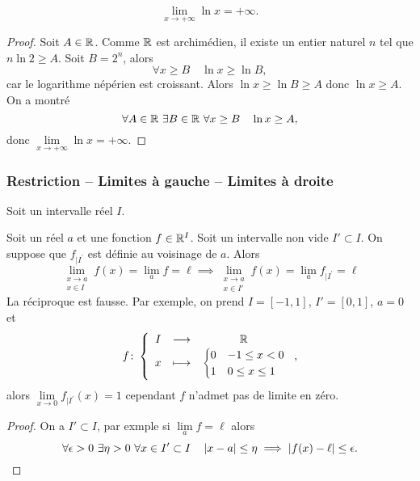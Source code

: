 \begin{theo}
  \begin{equation}
    \lim\limits_{x \to +\infty} \ln x = + \infty.
  \end{equation}
\end{theo}
\begin{proof}
  Soit $A \in \mathbb{R}$. Comme $\mathbb{R}$ est archimédien, il existe un entier naturel $n$ tel que $n \ln 2 \geq A$. Soit $B=2^n$, alors
  \begin{equation}
    \forall x \geq B \quad \ln x \geq \ln B,
  \end{equation}
  car le logarithme népérien est croissant. Alors $\ln x \geq \ln B \geq A$ donc $\ln x \geq A$. On a montré
\begin{equation}
  \forall A \in \mathbb{R} \ \exists B \in \mathbb{R} \ \forall x \geq B \quad \ln x \geq A,
\end{equation}
donc $\lim\limits_{x \to +\infty} \ln x = + \infty$.
\end{proof}

\subsubsection{Restriction -- Limites à gauche -- Limites à droite}
Soit un intervalle réel $I$.
\begin{prop}
  Soit un réel $a$ et une fonction $f \in \mathbb{R}^I$. Soit un intervalle non vide $I' \subset I$. On suppose que $f_{|I^{'}}$ est définie au voisinage de $a$. Alors
  \begin{equation}
    \lim\limits_{\begin{array}{l} x \to a \\ x \in I\end{array}}f(x)=\lim\limits_{a}f=\ell \implies \lim\limits_{\begin{array}{l} x \to a \\ x \in I'\end{array}}f(x)=\lim\limits_{a}f_{|I^{'}}=\ell
  \end{equation}
La réciproque est fausse. Par exemple, on prend $I=[-1,1]$, $I'=[0,1]$, $a=0$ et
\begin{equation}
  f\colon \left\{\begin{array}{ccc} I & \longrightarrow &\mathbb{R}\\ x & \longmapsto & \begin{cases} 0 & -1 \leq x < 0 \\ 1 & 0 \leq x \leq 1\end{cases} \end{array} \right.,
\end{equation}
alors $\lim\limits_{x \to 0}f_{|I^{'}}(x)=1$ cependant $f$ n'admet pas de limite en zéro.
\end{prop}
\begin{proof}
  On a $ I' \subset I$, par exmple si $\lim\limits_{a} f =\ell$ alors
  \begin{equation}
    \forall \epsilon > 0 \ \exists \eta > 0 \ \forall x \in I' \subset I \quad \left\lvert x-a\right\rvert \leq \eta \implies \left\lvert f(x) - \ell\right\rvert \leq \epsilon.
  \end{equation}
\end{proof}

